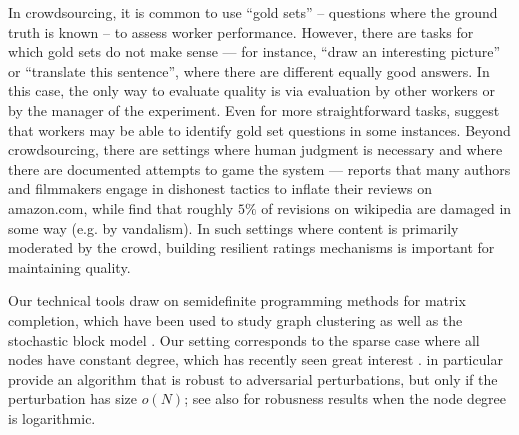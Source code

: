 In crowdsourcing, it is common to use ``gold sets'' -- questions where the 
ground truth is known -- to assess worker performance. 
However, there are tasks for which gold sets do not make sense
--- for instance, ``draw an interesting picture'' or ``translate this sentence'', 
where there are different equally good answers. In this case, the only way to 
evaluate quality is via evaluation by other workers or by the manager of 
the experiment. Even for more straightforward tasks, \citet{vuurens2011spam} 
suggest that workers may be able to identify gold set questions in some 
instances. Beyond crowdsourcing, there are settings where human judgment is 
necessary and where there are documented attempts to game the system --- 
\citet{harmon2004amazon} reports that many authors and filmmakers 
engage in dishonest tactics to inflate their reviews on amazon.com, while 
\citet{priedhorsky2007creating} find that roughly $5\%$ of revisions on 
wikipedia are damaged in some way (e.g. by vandalism). In such settings where 
content is primarily moderated by the crowd, building resilient ratings 
mechanisms is important for maintaining quality.

Our technical tools draw on semidefinite programming methods for matrix 
completion, which have been used to study graph clustering as well 
as the stochastic block model \citep{holland1983stochastic,condon2001algorithms}. 
Our setting corresponds to the sparse case where all nodes have constant degree, 
which has recently seen great interest \citep{decelle2011asymptotic,
mossel2012stochastic,mossel2013proof,mossel2013belief,
massoulie2014community,guedon2014community,mossel2015consistency,
chin2015stochastic,abbe2015community,makarychev2015learning}. 
\citet{makarychev2015learning} in particular provide an algorithm that is 
robust to adversarial perturbations, but only if the perturbation has 
size $o(N)$; see also \citet{cai2015robust} for robusness results when 
the node degree is logarithmic.


